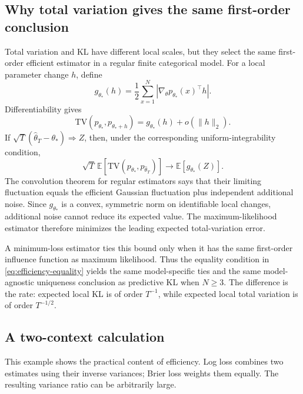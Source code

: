 \documentclass[11pt,twoside]{article}
\newcommand{\TV}{\mathrm{TV}}
\theoremstyle{definition}
\theoremstyle{remark}
\begin{document}
\subsection{Why total variation gives the same first-order conclusion}
\label{app:tv-efficiency}

Total variation and KL have different local scales, but they select the same
first-order efficient estimator in a regular finite categorical model. For a
local parameter change $h$, define
\begin{equation}
g_{\theta_*}(h)
=\frac12\sum_{x=1}^N
\left|\nabla_\theta p_{\theta_*}(x)^\top h\right|.
\label{eq:local-tv-norm}
\end{equation}
Differentiability gives
\begin{equation}
\TV(p_{\theta_*},p_{\theta_*+h})
=g_{\theta_*}(h)+o(\lVert h\rVert_2).
\label{eq:local-tv-appendix}
\end{equation}
If
$\sqrt T(\widehat\theta_T-\theta_*)\Longrightarrow Z$, then, under the
corresponding uniform-integrability condition,
\begin{equation}
\sqrt T\,\mathbb E\!\left[
\TV(p_{\theta_*},p_{\widehat\theta_T})
\right]
\longrightarrow \mathbb E[g_{\theta_*}(Z)].
\label{eq:expected-local-tv}
\end{equation}
The convolution theorem for regular estimators says that their limiting
fluctuation equals the efficient Gaussian fluctuation plus independent
additional noise. Since
$g_{\theta_*}$ is a convex, symmetric norm on identifiable local changes,
additional noise cannot reduce its expected value. The maximum-likelihood
estimator therefore minimizes the leading expected total-variation error.

A minimum-loss estimator ties this bound only when it has the same first-order
influence function as maximum likelihood. Thus the equality condition in
\cref{eq:efficiency-equality} yields the same model-specific ties and the same
model-agnostic uniqueness conclusion as predictive KL when $N\ge3$. The
difference is the rate: expected local KL is of order $T^{-1}$, while expected
local total variation is of order $T^{-1/2}$.

\subsection{A two-context calculation}
\label{sec:two-context-efficiency}

This example shows the practical content of efficiency. Log loss combines two
estimates using their inverse variances; Brier loss weights them equally. The
resulting variance ratio can be arbitrarily large.
\end{document}
